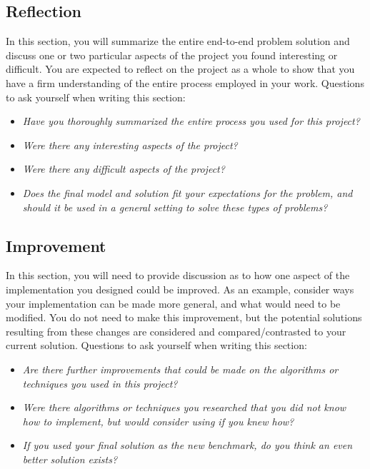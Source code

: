 \documentclass{article}
\begin{document}
\subsection{Reflection}\label{reflection}

In this section, you will summarize the entire end-to-end problem
solution and discuss one or two particular aspects of the project you
found interesting or difficult. You are expected to reflect on the
project as a whole to show that you have a firm understanding of the
entire process employed in your work. Questions to ask yourself when
writing this section:

\begin{itemize}
\item
  \emph{Have you thoroughly summarized the entire process you used for
  this project?}
\item
  \emph{Were there any interesting aspects of the project?}
\item
  \emph{Were there any difficult aspects of the project?}
\item
  \emph{Does the final model and solution fit your expectations for the
  problem, and should it be used in a general setting to solve these
  types of problems?}
\end{itemize}

\subsection{Improvement}\label{improvement}

In this section, you will need to provide discussion as to how one
aspect of the implementation you designed could be improved. As an
example, consider ways your implementation can be made more general, and
what would need to be modified. You do not need to make this
improvement, but the potential solutions resulting from these changes
are considered and compared/contrasted to your current solution.
Questions to ask yourself when writing this section:

\begin{itemize}
\item
  \emph{Are there further improvements that could be made on the
  algorithms or techniques you used in this project?}
\item
  \emph{Were there algorithms or techniques you researched that you did
  not know how to implement, but would consider using if you knew how?}
\item
  \emph{If you used your final solution as the new benchmark, do you
  think an even better solution exists?}
\end{itemize}
\end{document}
